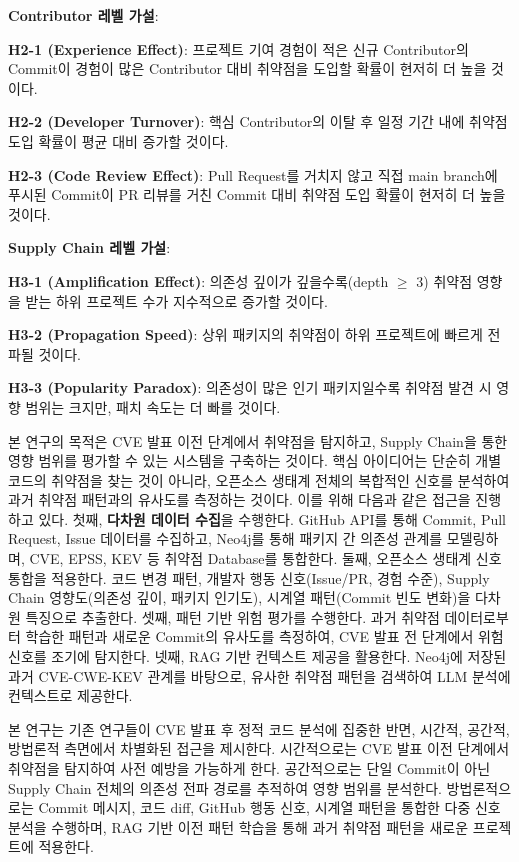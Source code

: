 ﻿\documentclass[conference]{IEEEtran}
\begin{document}
\noindent\textbf{Contributor 레벨 가설}:

\noindent\textbf{H2-1 (Experience Effect)}: 프로젝트 기여 경험이 적은 신규 Contributor의 Commit이 경험이 많은 Contributor 대비 취약점을 도입할 확률이 현저히 더 높을 것이다.

\noindent\textbf{H2-2 (Developer Turnover)}: 핵심 Contributor의 이탈 후 일정 기간 내에 취약점 도입 확률이 평균 대비 증가할 것이다.

\noindent\textbf{H2-3 (Code Review Effect)}: Pull Request를 거치지 않고 직접 main branch에 푸시된 Commit이 PR 리뷰를 거친 Commit 대비 취약점 도입 확률이 현저히 더 높을 것이다.

\noindent\textbf{Supply Chain 레벨 가설}:

\noindent\textbf{H3-1 (Amplification Effect)}: 의존성 깊이가 깊을수록(depth $\geq$ 3) 취약점 영향을 받는 하위 프로젝트 수가 지수적으로 증가할 것이다.

\noindent\textbf{H3-2 (Propagation Speed)}: 상위 패키지의 취약점이 하위 프로젝트에 빠르게 전파될 것이다.

\noindent\textbf{H3-3 (Popularity Paradox)}: 의존성이 많은 인기 패키지일수록 취약점 발견 시 영향 범위는 크지만, 패치 속도는 더 빠를 것이다.

\noindent\indent 본 연구의 목적은 CVE 발표 이전 단계에서 취약점을 탐지하고, Supply Chain을 통한 영향 범위를 평가할 수 있는 시스템을 구축하는 것이다. 핵심 아이디어는 단순히 개별 코드의 취약점을 찾는 것이 아니라, 오픈소스 생태계 전체의 복합적인 신호를 분석하여 과거 취약점 패턴과의 유사도를 측정하는 것이다. 이를 위해 다음과 같은 접근을 진행하고 있다. 첫째, \textbf{다차원 데이터 수집}을 수행한다. GitHub API를 통해 Commit, Pull Request, Issue 데이터를 수집하고, Neo4j를 통해 패키지 간 의존성 관계를 모델링하며, CVE, EPSS, KEV 등 취약점 Database를 통합한다. 둘째, 오픈소스 생태계 신호 통합을 적용한다. 코드 변경 패턴, 개발자 행동 신호(Issue/PR, 경험 수준), Supply Chain 영향도(의존성 깊이, 패키지 인기도), 시계열 패턴(Commit 빈도 변화)을 다차원 특징으로 추출한다. 셋째, 패턴 기반 위험 평가를 수행한다. 과거 취약점 데이터로부터 학습한 패턴과 새로운 Commit의 유사도를 측정하여, CVE 발표 전 단계에서 위험 신호를 조기에 탐지한다. 넷째, RAG 기반 컨텍스트 제공을 활용한다. Neo4j에 저장된 과거 CVE-CWE-KEV 관계를 바탕으로, 유사한 취약점 패턴을 검색하여 LLM 분석에 컨텍스트로 제공한다.

본 연구는 기존 연구들이 CVE 발표 후 정적 코드 분석에 집중한 반면, 시간적, 공간적, 방법론적 측면에서 차별화된 접근을 제시한다. 시간적으로는 CVE 발표 이전 단계에서 취약점을 탐지하여 사전 예방을 가능하게 한다. 공간적으로는 단일 Commit이 아닌 Supply Chain 전체의 의존성 전파 경로를 추적하여 영향 범위를 분석한다. 방법론적으로는 Commit 메시지, 코드 diff, GitHub 행동 신호, 시계열 패턴을 통합한 다중 신호 분석을 수행하며, RAG 기반 이전 패턴 학습을 통해 과거 취약점 패턴을 새로운 프로젝트에 적용한다.
\end{document}
